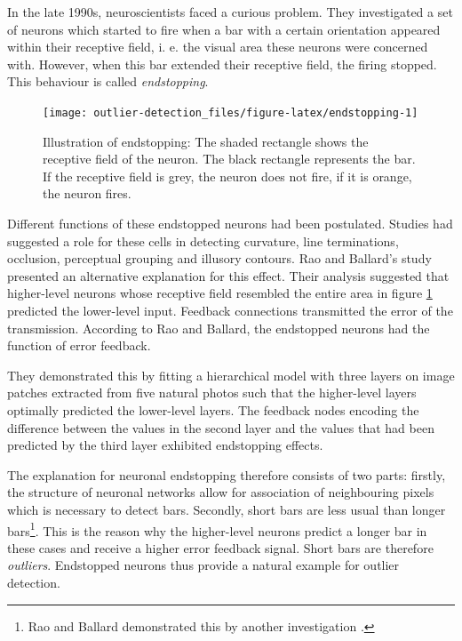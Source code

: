 \documentclass[]{report}
\let\rmarkdownfootnote\footnote%
\def\footnote{\protect\rmarkdownfootnote}
\theoremstyle{definition}
\theoremstyle{definition}
\theoremstyle{definition}
\theoremstyle{remark}
\begin{document}
\setcounter{page}{1}

In the late 1990s, neuroscientists faced a curious problem. They
investigated a set of neurons which started to fire when a bar with a
certain orientation appeared within their receptive field, i. e. the
visual area these neurons were concerned with. However, when this bar
extended their receptive field, the firing stopped. This behaviour is
called \emph{endstopping}.

\begin{figure}
\texttt{[image: outlier-detection\_files/figure-latex/endstopping-1]} \caption{Illustration of endstopping: The shaded rectangle
shows the receptive field of the neuron. The black rectangle represents
the bar. If the receptive field is grey, the neuron does not fire, if it
is orange, the neuron fires.}\label{fig:endstopping}
\end{figure}






Different functions of these endstopped neurons had been postulated.
Studies had suggested a role for these cells in detecting curvature,
line terminations, occlusion, perceptual grouping and illusory contours.
\citep{Rao1999} Rao and Ballard's study presented an alternative
explanation for this effect. Their analysis suggested that higher-level
neurons whose receptive field resembled the entire area in figure
\ref{fig:endstopping} predicted the lower-level input. Feedback
connections transmitted the error of the transmission. According to Rao
and Ballard, the endstopped neurons had the function of error feedback.

They demonstrated this by fitting a hierarchical model with three layers
on image patches extracted from five natural photos such that the
higher-level layers optimally predicted the lower-level layers. The
feedback nodes encoding the difference between the values in the second
layer and the values that had been predicted by the third layer
exhibited endstopping effects. \citep{Rao1999}

The explanation for neuronal endstopping therefore consists of two
parts: firstly, the structure of neuronal networks allow for association
of neighbouring pixels which is necessary to detect bars. Secondly,
short bars are less usual than longer bars\footnote{Rao and Ballard
  demonstrated this by another investigation \citep{Rao1999}.}. This is
the reason why the higher-level neurons predict a longer bar in these
cases and receive a higher error feedback signal. Short bars are
therefore \emph{outliers}. Endstopped neurons thus provide a natural
example for outlier detection.
\end{document}
